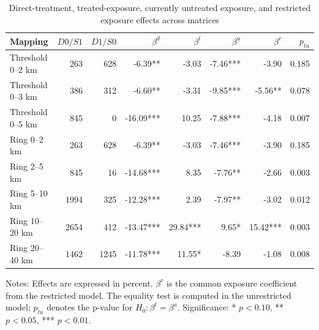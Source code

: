 \begin{table}[!htbp]\centering
\caption{Direct-treatment, treated-exposure, currently untreated exposure, and restricted exposure effects across matrices}
\label{tab:ulez_across_matrices_protocol}
\begin{threeparttable}
\scriptsize
\setlength{\tabcolsep}{2pt}
\renewcommand{\arraystretch}{1.08}
\begin{tabularx}{\textwidth}{@{}>{\RaggedRight\arraybackslash}Xrrrrrrr@{}}
\toprule
Mapping & $D0/S1$ & $D1/S0$ & $\beta^d$ & $\beta^t$ & $\beta^u$ & $\beta^r$ & $p_{tu}$ \\
\midrule
Threshold 0--2 km & 263 & 628 & -6.39** & -3.03 & -7.46*** & -3.90 & 0.185 \\
Threshold 0--3 km & 386 & 312 & -6.60** & -3.31 & -9.85*** & -5.56** & 0.078 \\
Threshold 0--5 km & 845 & 0 & -16.09*** & 10.25 & -7.88*** & -4.18 & 0.007 \\
Ring 0--2 km & 263 & 628 & -6.39** & -3.03 & -7.46*** & -3.90 & 0.185 \\
Ring 2--5 km & 845 & 16 & -14.68*** & 8.35 & -7.76** & -2.66 & 0.003 \\
Ring 5--10 km & 1994 & 325 & -12.28*** & 2.39 & -7.97** & -3.02 & 0.012 \\
Ring 10--20 km & 2654 & 412 & -13.47*** & 29.84*** & 9.65* & 15.42*** & 0.003 \\
Ring 20--40 km & 1462 & 1245 & -11.78*** & 11.55* & -8.39 & -1.08 & 0.008 \\
\bottomrule
\end{tabularx}
\begin{tablenotes}[flushleft]
\footnotesize
\item Notes: Effects are expressed in percent. $\beta^r$ is the common exposure coefficient from the restricted model. The equality test is computed in the unrestricted model; $p_{tu}$ denotes the p-value for $H_0:\beta^t=\beta^u$. Significance: * $p<0.10$, ** $p<0.05$, *** $p<0.01$.
\end{tablenotes}
\end{threeparttable}
\end{table}
